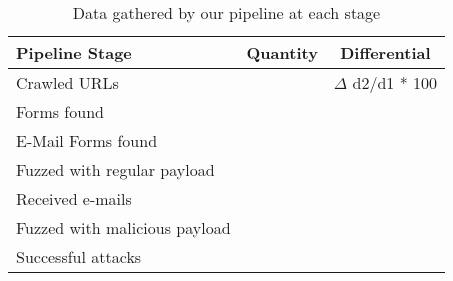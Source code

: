 \begin{table}[tbp]
	\centering
	\scriptsize
	\begin{tabular}{|l|c|c|}
		\hline
		\textbf{Pipeline Stage} & \textbf{Quantity} & \textbf{Differential}\\
		\hline
		Crawled URLs  & \urls & $\Delta$ d2/d1 * 100 \\
		\hline
		Forms found  & \forms & \formsDelta \\
		\hline
		E-Mail Forms found  & \emailforms & \emailformsDelta \\
		\hline
		Fuzzed with regular payload  & \fuzzed & \fuzzedDelta \\
		\hline
		Received e-mails  & \recd & \recdDelta \\
		\hline
		Fuzzed with malicious payload  & \malfuzzed & \malfuzzedDelta \\
		\hline
		Successful attacks  & \success & \successDelta \\
		\hline

	\end{tabular}
	\caption[]{Data gathered
      by our pipeline at each stage}
    
	\label{tab:pipeline}
\end{table}
